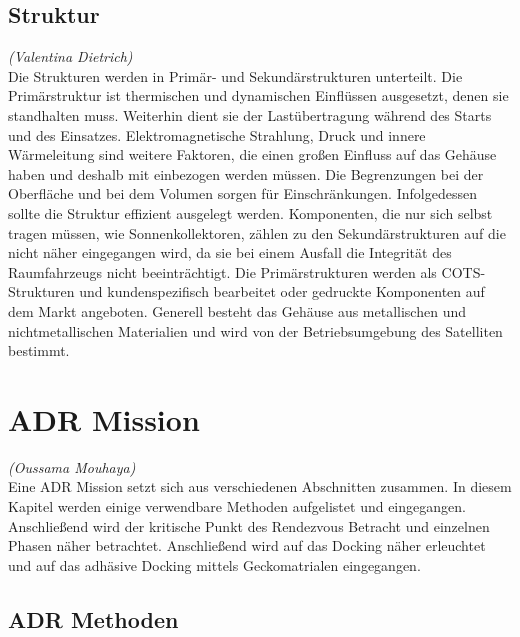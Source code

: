 		\subsection{Struktur}%
		\hfill\emph{(Valentina Dietrich)}\\
Die Strukturen werden in Primär- und Sekundärstrukturen unterteilt. Die Primärstruktur ist thermischen und dynamischen Einflüssen ausgesetzt, denen sie standhalten muss. Weiterhin dient sie der Lastübertragung während des Starts und des Einsatzes. Elektromagnetische Strahlung, Druck und innere Wärmeleitung sind weitere Faktoren, die einen großen Einfluss auf das Gehäuse haben und deshalb mit einbezogen werden müssen. Die Begrenzungen bei der Oberfläche und bei dem Volumen sorgen für Einschränkungen. Infolgedessen sollte die Struktur effizient ausgelegt werden. Komponenten, die nur sich selbst tragen müssen, wie Sonnenkollektoren, zählen zu den Sekundärstrukturen auf die nicht näher eingegangen wird, da sie bei einem Ausfall die Integrität des Raumfahrzeugs nicht beeinträchtigt. Die Primärstrukturen werden als COTS-Strukturen und kundenspezifisch bearbeitet oder gedruckte Komponenten auf dem Markt angeboten. Generell besteht das Gehäuse aus metallischen und nichtmetallischen Materialien und wird von der Betriebsumgebung des Satelliten bestimmt. \cite[S. 96 - 108]{NASA.Sota.2018} 

	\section{ADR Mission}
		\hfill\emph{(Oussama Mouhaya)}\\
Eine ADR Mission setzt sich aus verschiedenen Abschnitten zusammen. In diesem Kapitel werden einige verwendbare Methoden aufgelistet und eingegangen. Anschließend wird der kritische Punkt des Rendezvous Betracht und einzelnen Phasen näher betrachtet. Anschließend wird auf das Docking näher erleuchtet und auf das adhäsive Docking mittels Geckomatrialen  eingegangen. 
\subsection{ADR Methoden}
	
